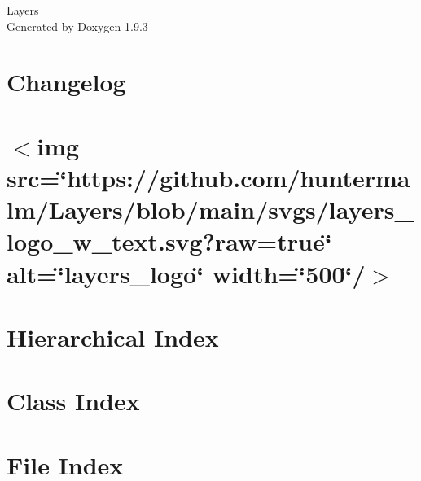 \documentclass[twoside]{book}
\newcommand{\+}{\discretionary{\mbox{\scriptsize$\hookleftarrow$}}{}{}}
\newcommand{\clearemptydoublepage}{%
    \newpage{\pagestyle{empty}\cleardoublepage}%
  }
\begin{document}
  \raggedbottom
    \hypersetup{pageanchor=false,
                bookmarksnumbered=true,
                pdfencoding=unicode
               }
  \begin{titlepage}
  \vspace*{7cm}
  \begin{center}%
  {\Large Layers}\\
  \vspace*{1cm}
  {\large Generated by Doxygen 1.9.3}\\
  \end{center}
  \end{titlepage}
  \clearemptydoublepage
  \tableofcontents
  \clearemptydoublepage
  \hypersetup{pageanchor=true}
\chapter{Changelog}
\label{md__c_h_a_n_g_e_l_o_g}

\chapter{\texorpdfstring{$<$}{<}img src=\char`\"{}https\+://github.\+com/huntermalm/\+Layers/blob/main/svgs/layers\+\_\+logo\+\_\+w\+\_\+text.\+svg?raw=true\char`\"{} alt=\char`\"{}layers\+\_\+logo\char`\"{} width=\char`\"{}500\char`\"{}/\texorpdfstring{$>$}{>}}
\label{md__r_e_a_d_m_e}

\chapter{Hierarchical Index}

\chapter{Class Index}

\chapter{File Index}

\end{document}
